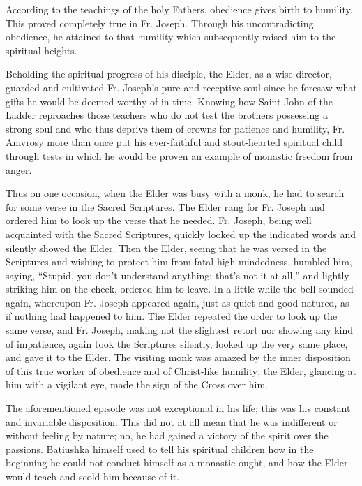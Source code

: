 According to the teachings of the holy Fathers, obedience gives birth to humility. This proved completely true in Fr. Joseph. Through his uncontradicting obedience, he attained to that humility which subsequently raised him to the spiritual heights.

Beholding the spiritual progress of his disciple, the Elder, as a wise director, guarded and cultivated Fr. Joseph's pure and receptive soul since he foresaw what gifts he would be deemed worthy of in time. Knowing how Saint John of the Ladder reproaches those teachers who do not test the brothers possessing a strong soul and who thus deprive them of crowns for patience and humility, Fr. Amvrosy more than once put his ever-faithful and stout-hearted spiritual child through tests in which he would be proven an example of monastic freedom from anger.

Thus on one occasion, when the Elder was busy with a monk, he had to search for some verse in the Sacred Scriptures. The Elder rang for Fr. Joseph and ordered him to look up the verse that he needed. Fr. Joseph, being well acquainted with the Sacred Scriptures, quickly looked up the indicated words and silently showed the Elder. Then the Elder, seeing that he was versed in the Scriptures and wishing to protect him from fatal high-mindedness, humbled him, saying, ``Stupid, you don't understand anything; that's not it at all,'' and lightly striking him on the cheek, ordered him to leave. In a little while the bell sounded again, whereupon Fr. Joseph appeared again, just as quiet and good-natured, as if nothing had happened to him. The Elder repeated the order to look up the same verse, and Fr. Joseph, making not the slightest retort nor showing any kind of impatience, again took the Scriptures silently, looked up the very same place, and gave it to the Elder. The visiting monk was amazed by the inner disposition of this true worker of obedience and of Christ-like humility; the Elder, glancing at him with a vigilant eye, made the sign of the Cross over him.

The aforementioned episode was not exceptional in his life; this was his constant and invariable disposition. This did not at all mean that he was indifferent or without feeling by nature; no, he had gained a victory of the spirit over the passions. Batiushka himself used to tell his spiritual children how in the beginning he could not conduct himself as a monastic ought, and how the Elder would teach and scold him because of it.

